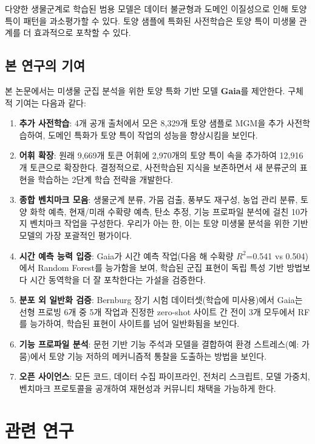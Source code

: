 \documentclass[11pt,a4paper]{article}
\begin{document}
다양한 생물군계로 학습된 범용 모델은 데이터 불균형과 도메인 이질성으로 인해 토양 특이 패턴을 과소평가할 수 있다. 토양 샘플에 특화된 사전학습은 토양 특이 미생물 관계를 더 효과적으로 포착할 수 있다.

\subsection{본 연구의 기여}

본 논문에서는 미생물 군집 분석을 위한 토양 특화 기반 모델 \textbf{Gaia}를 제안한다. 구체적 기여는 다음과 같다:

\begin{enumerate}[leftmargin=1.5em]
    \item \textbf{추가 사전학습}: 4개 공개 출처에서 모은 8,329개 토양 샘플로 MGM을 추가 사전학습하여, 도메인 특화가 토양 특이 작업의 성능을 향상시킴을 보인다.
    \item \textbf{어휘 확장}: 원래 9,669개 토큰 어휘에 2,970개의 토양 특이 속을 추가하여 12,916개 토큰으로 확장한다. 결정적으로, 사전학습된 지식을 보존하면서 새 분류군의 표현을 학습하는 2단계 학습 전략을 개발한다.
    \item \textbf{종합 벤치마크 모음}: 생물군계 분류, 가뭄 검출, 풍부도 재구성, 농업 관리 분류, 토양 화학 예측, 현재/미래 수확량 예측, 탄소 추정, 기능 프로파일 분석에 걸친 10가지 벤치마크 작업을 구성한다. 우리가 아는 한, 이는 토양 미생물 분석을 위한 기반 모델의 가장 포괄적인 평가이다.
    \item \textbf{시간 예측 능력 입증}: Gaia가 시간 예측 작업(다음 해 수확량 $R^2$=0.541 vs 0.504)에서 Random Forest를 능가함을 보여, 학습된 군집 표현이 독립 특성 기반 방법보다 시간 동역학을 더 잘 포착한다는 가설을 검증한다.
    \item \textbf{분포 외 일반화 검증}: Bernburg 장기 시험 데이터셋(학습에 미사용)에서 Gaia는 선형 프로빙 6개 중 5개 작업과 진정한 zero-shot 사이트 간 전이 3개 모두에서 RF를 능가하여, 학습된 표현이 사이트를 넘어 일반화됨을 보인다.
    \item \textbf{기능 프로파일 분석}: 문헌 기반 기능 주석과 모델을 결합하여 환경 스트레스(예: 가뭄)에서 토양 기능 저하의 메커니즘적 통찰을 도출하는 방법을 보인다.
    \item \textbf{오픈 사이언스}: 모든 코드, 데이터 수집 파이프라인, 전처리 스크립트, 모델 가중치, 벤치마크 프로토콜을 공개하여 재현성과 커뮤니티 채택을 가능하게 한다.
\end{enumerate}

\section{관련 연구}
\end{document}
